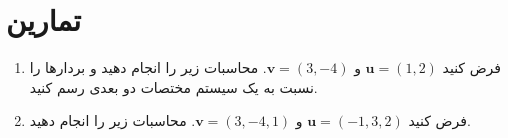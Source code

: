 \section{\textbf{تمارین}}
\label{sec:1.8}
{
    \Large
    \begin{spacing}{1.5}
        \begin{enumerate}[label=\textbf{\arabic*}.]
            \item {فرض کنید $\textbf{u}=(1,2)$ و $\textbf{v}=(3,-4)$. محاسبات زیر را انجام دهید و بردارها را نسبت به یک سیستم مختصات دو بعدی رسم کنید.}
            \begin{flushleft}
            \end{flushleft} \textbf{\vspace{-12pt}}

            \item {فرض کنید $\textbf{u}=(-1,3,2)$ و $\textbf{v}=(3,-4,1)$. محاسبات زیر را انجام دهید.}
            \begin{flushleft}
            \end{flushleft} \textbf{\vspace{-12pt}}


\end{enumerate}
\end{spacing}}
